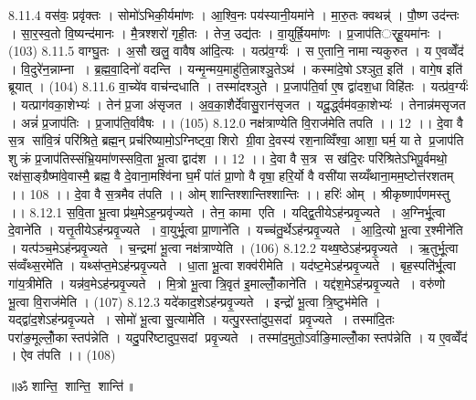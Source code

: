 8.11.4
वस॑वः॒ प्रवृ॑क्तः । सोमो॑ऽभिकी॒र्यमा॑णः । आ॒श्वि॒नः पय॑स्यानी॒यमा॑ने । मा॒रु॒तः क्वथन्न्॑ । पौ॒ष्ण उद॑न्तः । सा॒र॒स्व॒तो वि॒ष्यन्द॑मानः । मै॒त्रश्शरो॑ गृही॒तः । तेज॒ उद्य॑तः । वा॒युर्ह्रि॒यमा॑णः । प्र॒जाप॑तिर््हू॒यमा॑नः । (103)
8.11.5
वाग्घु॒तः । अ॒सौ खलु॒ वावैष आ॑दि॒त्यः । यत्प्र॑व॒र्ग्यः॑ । स ए॒तानि॒ नामान्यकुरुत । य ए॒वव्वेँद॑ । वि॒दुरे॑न॒न्नाम्ना । ब्र॒ह्म॒वा॒दिनो॑ वदन्ति । यन्मृ॒न्मय॒माहु॑ति॒न्नाश्ञु॒तेऽथ॑ । कस्मा॑दे॒षोऽश्ञुत॒ इति॑ । वागे॒ष इति॑ ब्रूयात् । (104)
8.11.6
वा॒च्ये॑व वाच॑न्दधाति । तस्मा॑दश्ञुते । प्र॒जाप॑ति॒र्वा ए॒ष द्वा॑दश॒धा विहि॑तः । यत्प्र॑व॒र्ग्यः॑ । यत्प्राग॑वका॒शेभ्यः॑ । तेन॑ प्र॒जा अ॑सृजत । अ॒व॒का॒शैर्दे॑वासु॒रान॑सृजत । यदू॒र्द्ध्वम॑वका॒शेभ्यः॑ । तेनान्न॑मसृजत । अन्नं॑ प्र॒जाप॑तिः । प्र॒जाप॑ति॒र्वावैषः ।। (105)
8.12.0
नक्ष॑त्राण्येति वि॒राज॑मेति तपति ।। 12 ।। दे॒वा वै स॒त्र सा॑वि॒त्रं परि॑श्रिते॒ ब्रह्म॒न् प्रच॑रिष्यामो॒ऽग्निष्ट्वा॒ शिरो ग्री॒वा दे॒वस्य॑ रश॒नाव्विँश्वा॒ आशा॒ घर्म॒ या ते प्र॒जाप॑ति शुक्रं प्र॒जाप॑तिस्संभ्रि॒यमा॑णस्सवि॒ता भू॒त्वा द्वाद॑श ।। 12 ।। दे॒वा वै स॒त्र स ख॑दि॒रः परि॑श्रितेऽभिपू॒र्वमथो॒ रक्ष॑सा॒ङ्ग्रैष्मा॑वे॒वास्मै॒ ब्रह्म॒ वै दे॒वाना॒मश्वि॑ना घ॒र्मं पा॑तं प्रा॒णो वै वृषा॒ हरि॒र्यो वै वसी॑यासय्यँथाना॒मम॒ष्टोत्त॑रशतम् ।। 108 ।। दे॒वा वै स॒त्रमैव त॑पति ।। ओम् शान्तिश्शान्तिश्शान्तिः ।। हरिः॑ ओम् । श्रीकृष्णार्पणमस्तु ।।
8.12.1
स॒वि॒ता भू॒त्वा प्र॑थ॒मेऽह॒न्प्रवृ॑ज्यते । तेन॒ कामा॑ एति । यद्द्वि॒तीयेऽह॑न्प्रवृ॒ज्यते । अ॒ग्निर्भू॒त्वा दे॒वाने॑ति । यत्तृ॒तीयेऽह॑न्प्रवृ॒ज्यते । वा॒युर्भू॒त्वा प्रा॒णाने॑ति । यच्च॑तु॒र्थेऽह॑न्प्रवृ॒ज्यते । आ॒दि॒त्यो भू॒त्वा र॒श्मीने॑ति । यत्प॑ञ्च॒मेऽह॑न्प्रवृ॒ज्यते । च॒न्द्रमा॑ भू॒त्वा नक्ष॑त्राण्येति । (106)
8.12.2
यथ्ष॒ष्ठेऽह॑न्प्रवृ॒ज्यते । ऋ॒तुर्भू॒त्वा स॑व्वँथ्स॒रमे॑ति । यथ्स॑प्त॒मेऽह॑न्प्रवृ॒ज्यते । धा॒ता भू॒त्वा शक्व॑रीमेति । यद॑ष्ट॒मेऽह॑न्प्रवृ॒ज्यते । बृह॒स्पति॑र्भू॒त्वा गा॑य॒त्रीमे॑ति । यन्न॑व॒मेऽह॑न्प्रवृ॒ज्यते । मि॒त्रो भू॒त्वा त्रि॒वृत॑ इ॒माल्लोँ॒काने॑ति । यद्द॑श॒मेऽह॑न्प्रवृ॒ज्यते । वरु॑णो भू॒त्वा वि॒राज॑मेति । (107)
8.12.3
यदे॑काद॒शेऽह॑न्प्रवृ॒ज्यते । इन्द्रो॑ भू॒त्वा त्रि॒ष्टुभ॑मेति । यद्द्वा॑द॒शेऽह॑न्प्रवृ॒ज्यते । सोमो॑ भू॒त्वा सु॒त्यामे॑ति । यत्पु॒रस्ता॑दुप॒सदां प्रवृ॒ज्यते । तस्मा॑दि॒तः परा॑ङ॒मूल्लोँ॒कास्तप॑न्नेति । यदु॒परि॑ष्टादुप॒सदां प्रवृ॒ज्यते । तस्मा॑द॒मुतो॒ऽर्वाङि॒माल्लोँ॒कास्तप॑न्नेति । य ए॒वव्वेँद॑ । ऐव त॑पति ।। (108)

\centerline{॥ॐ शान्ति॒ शान्ति॒ शान्ति॑॥}
